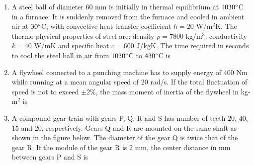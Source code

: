 \documentclass[journal]{IEEEtran}
\begin{document}
\begin{enumerate}[leftmargin=0pt]
\item A steel ball of diameter $60$ mm is initially in thermal equilibrium at $1030\degree$C in a furnace. It is suddenly removed from the furnace and cooled in ambient air at $30\degree$C, with convective heat transfer coefficient $h = 20$ W/m$^2$K. The thermo-physical properties of steel are: density $\rho = 7800$ kg/m$^3$, conductivity $k = 40$ W/mK and specific heat $c = 600$ J/kgK. The time required in seconds to cool the steel ball in air from $1030\degree$C to $430\degree$C is
\begin{enumerate}
\end{enumerate}
\hfill{}

\item A flywheel connected to a punching machine has to supply energy of $400$ Nm while running at a mean angular speed of $20$ rad/s. If the total fluctuation of speed is not to exceed $\pm 2\%$, the mass moment of inertia of the flywheel in kg-m$^2$ is
\begin{enumerate}
\end{enumerate}
\hfill{}

\item A compound gear train with gears P, Q, R and S has number of teeth $20$, $40$, $15$ and $20$, respectively. Gears Q and R are mounted on the same shaft as shown in the figure below. The diameter of the gear Q is twice that of the gear R. If the module of the gear R is $2$ mm, the center distance in mm between gears P and S is


\end{enumerate}
\end{document}
